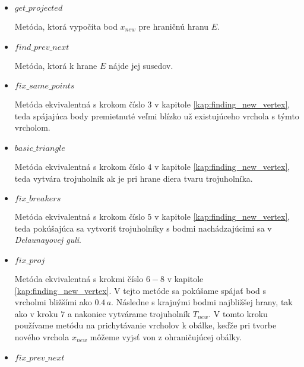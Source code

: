 \begin{itemize}
{\begin{itemize}
{                Metóda, v ktorej sa v správnom poradí volajú ďalšie metódy tak ako boli opísané v 
                kapitole \ref{kap:finding_new_vertex}.
                Ak sa nám v žiadnej z týchto metód neporadí nájsť nový trojuholník na konci kroku 
                označíme hranu $E = (x_i, x_j)$ za skontrolovanú.
            }
            \item{
                $get\_projected$

                Metóda, ktorá vypočíta bod $x_{new}$ pre hraničnú hranu $E$.
            }
            \item{
                $find\_prev\_next$

                Metóda, ktorá k hrane $E$ nájde jej susedov. 
            }
            \item{
                $fix\_same\_points$

                Metóda ekvivalentná s krokom číslo $3$ v kapitole \ref{kap:finding_new_vertex}, 
                teda spájajúca body premietnuté veľmi blízko už existujúceho vrchola s týmto vrcholom.
            }
            \item{
                $basic\_triangle$

                Metóda ekvivalentná s krokom číslo $4$ v kapitole \ref{kap:finding_new_vertex},
                teda vytvára trojuholník ak je pri hrane diera tvaru trojuholníka.
            }
            \item{
                $fix\_breakers$

                Metóda ekvivalentná s krokom číslo $5$ v kapitole \ref{kap:finding_new_vertex},
                teda pokúšajúca sa vytvoriť trojuholníky s bodmi nachádzajúcimi sa v 
                \textit{Delaunayovej guli}.
            }
            \item{
                $fix\_proj$

                Metóda ekvivalentná s krokmi číslo $6-8$ v kapitole \ref{kap:finding_new_vertex}.
                V tejto metóde sa pokúšame spájať bod s vrcholmi bližšími ako $0.4 \, a$. Následne 
                s krajnými bodmi najbližšej hrany, tak ako v kroku $7$ a nakoniec vytvárame 
                trojuholník $T_{new}$. V tomto kroku používame metódu na prichytávanie vrcholov
                k obálke, keďže pri tvorbe nového vrchola $x_{new}$ môžeme vyjsť von z 
                ohraničujúcej obálky.
            }
            \item{
                $fix\_prev\_next$

}
\end{itemize}}
\end{itemize}

